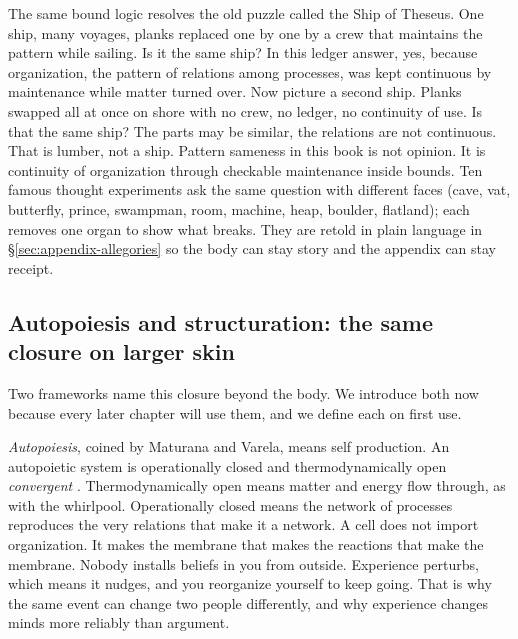 The same bound logic resolves the old puzzle called the Ship of Theseus. One ship, many voyages, planks replaced one by one by a crew that maintains the pattern while sailing. Is it the same ship? In this ledger answer, yes, because organization, the pattern of relations among processes, was kept continuous by maintenance while matter turned over. Now picture a second ship. Planks swapped all at once on shore with no crew, no ledger, no continuity of use. Is that the same ship? The parts may be similar, the relations are not continuous. That is lumber, not a ship. Pattern sameness in this book is not opinion. It is continuity of organization through checkable maintenance inside bounds. Ten famous thought experiments ask the same question with different faces (cave, vat, butterfly, prince, swampman, room, machine, heap, boulder, flatland); each removes one organ to show what breaks. They are retold in plain language in \S\ref{sec:appendix-allegories} so the body can stay story and the appendix can stay receipt.

\subsection*{Autopoiesis and structuration: the same closure on larger skin}

Two frameworks name this closure beyond the body. We introduce both now because every later chapter will use them, and we define each on first use.

\textit{Autopoiesis}, coined by Maturana and Varela, means self production. An autopoietic system is operationally closed and thermodynamically open \textit{convergent} \citep{maturana1980}. Thermodynamically open means matter and energy flow through, as with the whirlpool. Operationally closed means the network of processes reproduces the very relations that make it a network. A cell does not import organization. It makes the membrane that makes the reactions that make the membrane. Nobody installs beliefs in you from outside. Experience perturbs, which means it nudges, and you reorganize yourself to keep going. That is why the same event can change two people differently, and why experience changes minds more reliably than argument.

